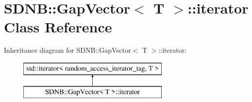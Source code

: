 \hypertarget{classSDNB_1_1GapVector_1_1iterator}{}\section{S\+D\+N\+B\+:\+:Gap\+Vector$<$ T $>$\+:\+:iterator Class Reference}
\label{classSDNB_1_1GapVector_1_1iterator}
Inheritance diagram for S\+D\+N\+B\+:\+:Gap\+Vector$<$ T $>$\+:\+:iterator\+:\begin{figure}[H]
\begin{center}
\leavevmode
\includegraphics[height=2.000000cm]{classSDNB_1_1GapVector_1_1iterator}
\end{center}
\end{figure}
